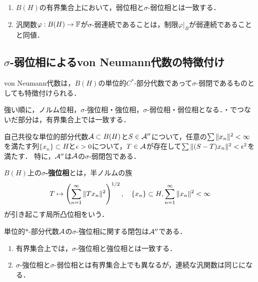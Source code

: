 \documentclass[uplatex,dvipdfmx]{jsreport}
\begin{document}
\begin{proposition}\mbox{}
    \begin{enumerate}
        \item $B(H)$の有界集合上において，弱位相と$\sigma$-弱位相とは一致する．
        \item 汎関数$\varphi:B(H)\to\mathbb{F}$が$\sigma$-弱連続であることは，制限$\varphi|_B$が弱連続であることと同値．
    \end{enumerate}
\end{proposition}

\subsection{$\sigma$-弱位相によるvon Neumann代数の特徴付け}

\begin{tcolorbox}[colframe=ForestGreen, colback=ForestGreen!10!white,breakable,colbacktitle=ForestGreen!40!white,coltitle=black,fonttitle=\bfseries\sffamily,
title=]
    von Neumann代数は，$B(H)$の単位的$C^*$-部分代数であって$\sigma$-弱閉であるものとしても特徴付けられる．

    強い順に，ノルム位相，$\sigma$-強位相・強位相，$\sigma$-弱位相・弱位相となる．・でつないだ部分は，有界集合上では一致する．
\end{tcolorbox}

\begin{proposition}
    自己共役な単位的部分代数$\mathcal{A}\subset B(H)$と$S\in\mathcal{A}''$について，任意の$\sum\|x_n\|^2<\infty$を満たす列$\{x_n\}\subset H$と$\epsilon>0$について，$T\in\mathcal{A}$が存在して$\sum\|(S-T)x_n\|^2<\epsilon^2$を満たす．
    特に，$\mathcal{A}''$は$\mathcal{A}$の$\sigma$-弱閉包である．
\end{proposition}

\begin{definition}
    $B(H)$上の\textbf{$\sigma$-強位相}とは，半ノルムの族
    \[T\mapsto\left(\sum^\infty_{n=1}\|Tx_n\|^2\right)^{1/2},\quad\{x_n\}\subset H,\sum^\infty_{n=1}\|x_n\|^2<\infty\]
    が引き起こす局所凸位相をいう．
\end{definition}

\begin{corollary}[命題の再翻訳]
    単位的$*$-部分代数$\mathcal{A}$の$\sigma$-強位相に関する閉包は$\mathcal{A}''$である．
\end{corollary}

\begin{lemma}\mbox{}
    \begin{enumerate}
        \item 有界集合上では，$\sigma$-強位相と強位相とは一致する．
        \item $\sigma$-強位相と$\sigma$-弱位相とは有界集合上でも異なるが，連続な汎関数は同じになる．
    \end{enumerate}
\end{lemma}
\end{document}
